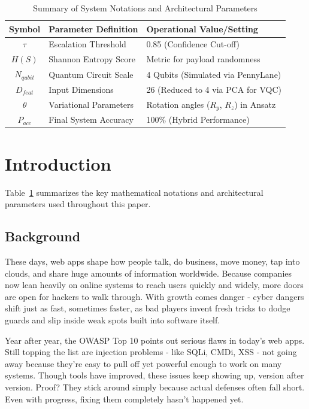 \documentclass[journal,onecolumn]{IEEEtran}
\begin{document}
\begin{table}[h]
\centering
\caption{Summary of System Notations and Architectural Parameters}
\label{tab:notations}
\small
\setlength{\tabcolsep}{1 pt}
\begin{tabular}{|c|l|l|}
\hline
\textbf{Symbol} & \textbf{Parameter Definition} & \textbf{Operational Value/Setting} \\
\hline
$\tau$ & Escalation Threshold & 0.85 (Confidence Cut-off) \\
\hline
$H(S)$ & Shannon Entropy Score & Metric for payload randomness \\
\hline
$N_{qubit}$ & Quantum Circuit Scale & 4 Qubits (Simulated via PennyLane) \\
\hline
$D_{feat}$ & Input Dimensions & 26 (Reduced to 4 via PCA for VQC) \\
\hline
$\theta$ & Variational Parameters & Rotation angles ($R_y$, $R_z$) in Ansatz \\
\hline
$P_{acc}$ & Final System Accuracy & 100\% (Hybrid Performance) \\
\hline
\end{tabular}
\end{table}


\section{Introduction}
Table~\ref{tab:notations} summarizes the key mathematical notations and architectural parameters used throughout this paper.

\subsection{Background}
These days, web apps shape how people talk, do business, move money, tap into clouds, and share huge amounts of information worldwide. Because companies now lean heavily on online systems to reach users quickly and widely, more doors are open for hackers to walk through. With growth comes danger - cyber dangers shift just as fast, sometimes faster, as bad players invent fresh tricks to dodge guards and slip inside weak spots built into software itself.

Year after year, the OWASP Top 10 points out serious flaws in today's web apps. Still topping the list are injection problems - like SQLi, CMDi, XSS - not going away because they're easy to pull off yet powerful enough to work on many systems. Though tools have improved, these issues keep showing up, version after version. Proof? They stick around simply because actual defenses often fall short. Even with progress, fixing them completely hasn't happened yet.
\end{document}
